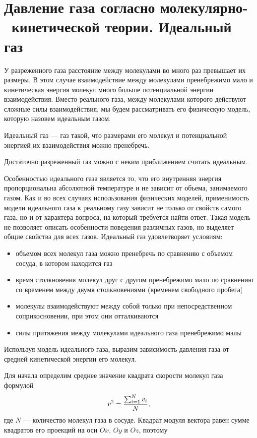 \section{Давление газа согласно молекулярно- \, кинетической теории. Идеальный газ}

	У разреженного газа расстояние между молекулами во много раз превышает их размеры. В этом случае взаимодействие между молекулами пренебрежимо мало и кинетическая энергия молекул много больше потенциальной энергии взаимодействия. Вместо реального газа, между молекулами которого действуют сложные силы взаимодействия, мы будем рассматривать его физическую модель, которую назовем идеальным газом. 
	\begin{defn}
		Идеальный газ --- газ такой, что размерами его молекул и потенциальной энергией их взаимодействия можно пренебречь.
	\end{defn}
	Достаточно разреженный газ можно с неким приближением считать идеальным.\par
	Особенностью идеального газа является то, что его внутренняя энергия пропорциональна абсолютной температуре и не зависит от объема, занимаемого газом. Как и во всех случаях использования физических моделей, применимость модели идеального газа к реальному газу зависит не только от свойств самого газа, но и от характера вопроса, на который требуется найти ответ. Такая модель не позволяет описать особенности поведения различных газов, но выделяет общие свойства для всех газов. Идеальный газ удовлетворяет условиям:
	\begin{itemize}
		\item объемом всех молекул газа можно пренебречь по сравнению с объемом сосуда, в котором находится газ
		\item время столкновения молекул друг с другом пренебрежимо мало по сравнению со временем между двумя столкновениями (временем свободного пробега)
		\item молекулы взаимодействуют между собой только при непосредственном соприкосновении, при этом они отталкиваются
		\item силы притяжения между молекулами идеального газа пренебрежимо малы
	\end{itemize}
	Используя модель идеального газа, выразим зависимость давления газа от средней кинетической энергии его молекул.\par
	Для начала определим среднее значение квадрата скорости молекул газа формулой
		$$\bar v^2=\frac{\sum_{i=1}^N v_i}{N},$$ 
	где $N$ --- количество молекул газа в сосуде. Квадрат модуля вектора равен сумме квадратов его проекций на оси $Ox$, $Oy$ и $Oz$, поэтому
